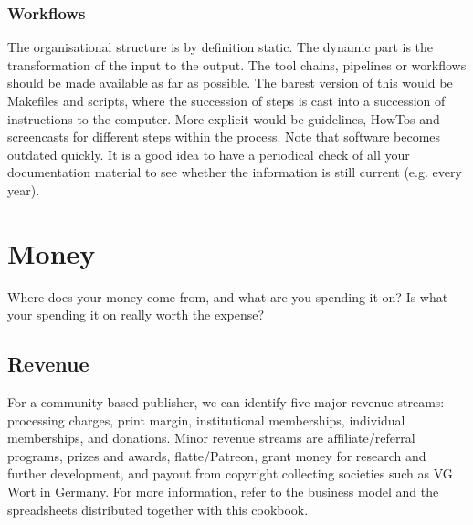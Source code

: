 \documentclass[guidelines,nonflat,modfonts] {langsci/langscibook}
\begin{document}
\begin{figure}
{ 
}
\end{figure}

\subsubsection{Workflows}
The organisational structure is by definition static. The dynamic part is the transformation of the input to the output. The tool chains, pipelines or workflows should be made available as far as possible. The barest version of this would be Makefiles and scripts, where the succession of steps is cast into a succession of instructions to the computer. More explicit would be guidelines, HowTos and screencasts for different steps within the process. Note that software becomes outdated quickly. It is a good idea to have a periodical check of all your documentation material to see whether the information is still current (e.g. every year). 

\section{Money}
Where does your money come from, and what are you spending it on? Is what your spending it on really worth the expense? 
\subsection{Revenue}
For a community-based publisher, we can identify five major revenue streams: processing charges, print margin, institutional memberships, individual memberships, and donations. 
Minor revenue streams are affiliate/referral programs, prizes and awards, flatte/Patreon, grant money for research and further development, and payout from copyright collecting societies such as VG Wort in Germany. 
For more information, refer to the business model and the spreadsheets distributed together with this cookbook. 
\end{document}
